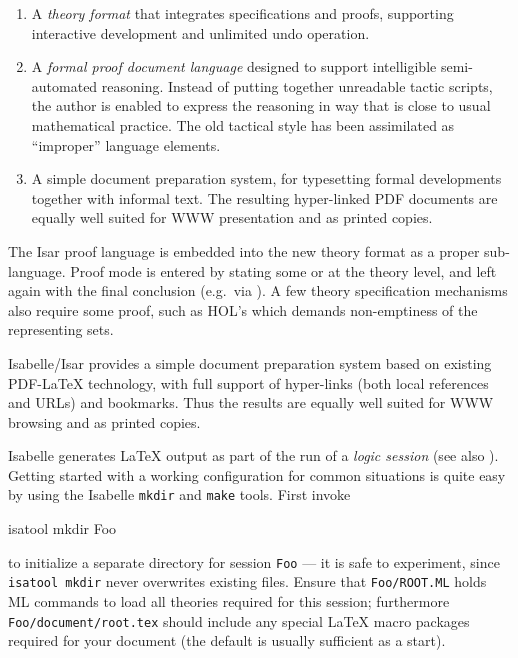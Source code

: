 \begin{isabellebody}
\begin{isamarkuptext}
  \begin{enumerate}
  
  \item A \emph{theory format} that integrates specifications and
  proofs, supporting interactive development and unlimited undo
  operation.
  
  \item A \emph{formal proof document language} designed to support
  intelligible semi-automated reasoning.  Instead of putting together
  unreadable tactic scripts, the author is enabled to express the
  reasoning in way that is close to usual mathematical practice.  The
  old tactical style has been assimilated as ``improper'' language
  elements.
  
  \item A simple document preparation system, for typesetting formal
  developments together with informal text.  The resulting
  hyper-linked PDF documents are equally well suited for WWW
  presentation and as printed copies.

  \end{enumerate}

  The Isar proof language is embedded into the new theory format as a
  proper sub-language.  Proof mode is entered by stating some
  \hyperlink{command.theorem}{\mbox{}} or \hyperlink{command.lemma}{\mbox{}} at the theory level, and
  left again with the final conclusion (e.g.\ via \hyperlink{command.qed}{\mbox{}}).
  A few theory specification mechanisms also require some proof, such
  as HOL's \hyperlink{command.typedef}{\mbox{}} which demands non-emptiness of the
  representing sets.%
\end{isamarkuptext}%
\isamarkuptrue%
%
\isamarkuptrue%
%
\begin{isamarkuptext}%
Isabelle/Isar provides a simple document preparation system based on
  existing {PDF-\LaTeX} technology, with full support of hyper-links
  (both local references and URLs) and bookmarks.  Thus the results
  are equally well suited for WWW browsing and as printed copies.

  \medskip Isabelle generates {\LaTeX} output as part of the run of a
  \emph{logic session} (see also \cite{isabelle-sys}).  Getting
  started with a working configuration for common situations is quite
  easy by using the Isabelle \verb|mkdir| and \verb|make|
  tools.  First invoke
\begin{ttbox}
  isatool mkdir Foo
\end{ttbox}
  to initialize a separate directory for session \verb|Foo| ---
  it is safe to experiment, since \verb|isatool mkdir| never
  overwrites existing files.  Ensure that \verb|Foo/ROOT.ML|
  holds ML commands to load all theories required for this session;
  furthermore \verb|Foo/document/root.tex| should include any
  special {\LaTeX} macro packages required for your document (the
  default is usually sufficient as a start).


\end{isamarkuptext}
\end{isabellebody}
